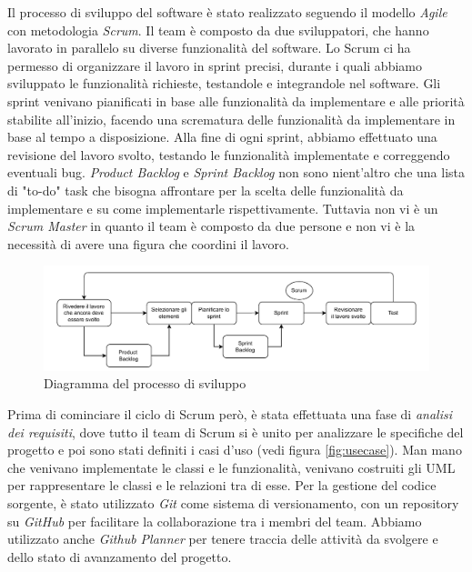 \documentclass[a4paper]{article}
\begin{document}
Il processo di sviluppo del software è stato realizzato seguendo il modello \textit{Agile} con metodologia \textit{Scrum}.
Il team è composto da due sviluppatori, che hanno lavorato in parallelo su diverse funzionalità del software.
Lo Scrum ci ha permesso di organizzare il lavoro in sprint precisi, durante i quali abbiamo
sviluppato le funzionalità richieste, testandole e integrandole nel software. 
Gli sprint venivano pianificati in base alle funzionalità da implementare e alle priorità stabilite all'inizio,
facendo una scrematura delle funzionalità da implementare in base al tempo a disposizione. 
Alla fine di ogni sprint, abbiamo effettuato una revisione del lavoro svolto, testando le funzionalità implementate e correggendo eventuali bug.
\textit{Product Backlog} e \textit{Sprint Backlog} non sono nient'altro che una lista di "to-do" task che bisogna affrontare per la scelta delle funzionalità da implementare
e su come implementarle rispettivamente. Tuttavia non vi è un \textit{Scrum Master} in quanto il team è composto da due persone e non vi è la necessità di avere una figura che coordini il lavoro.
\begin{figure}[H]
  \begin{center}
    \includegraphics[width=1\textwidth]{adProcessodiSviluppo.pdf}
  \end{center}
  \caption{Diagramma del processo di sviluppo}
  \label{fig:adProcessodiSviluppo}
\end{figure}
\noindent
Prima di cominciare il ciclo di Scrum però, è stata effettuata una fase di \textit{analisi dei requisiti}, dove tutto il team di Scrum si è unito per 
analizzare le specifiche del progetto e poi sono stati definiti i casi d'uso (vedi figura \ref{fig:usecase}).
Man mano che venivano implementate le classi e le funzionalità, venivano costruiti gli UML per rappresentare le classi e le relazioni tra di esse.
Per la gestione del codice sorgente, è stato utilizzato \textit{Git} come sistema di versionamento, con un repository su \textit{GitHub} per facilitare la collaborazione tra i membri del team.
Abbiamo utilizzato anche \textit{Github Planner} per tenere traccia delle attività da svolgere e dello stato di avanzamento del progetto.
\end{document}
